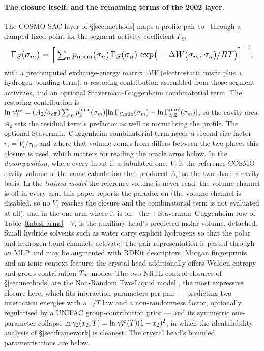 \paragraph{The closure itself, and the remaining terms of the 2002 layer.} The COSMO-SAC layer of
\S\ref{sec:methods} maps a profile pair to \lng\ through a damped fixed point for the segment
activity coefficient $\Gamma_{S}$,
\begin{equation}
  \resizebox{0.98\columnwidth}{!}{$\displaystyle
  \Gamma_{S}(\sigma_m)=\Big[\textstyle\sum_n p_{\mathrm{norm}}(\sigma_n)\,\Gamma_{S}(\sigma_n)\,
  \exp\!\big(-\Delta W(\sigma_m,\sigma_n)/RT\big)\Big]^{-1}$},
  \label{eq:cosmo}
\end{equation}
with a precomputed exchange-energy matrix $\Delta W$ (electrostatic misfit plus a hydrogen-bonding
term), a restoring contribution assembled from those segment activities, and an optional
Staverman--Guggenheim combinatorial term. The restoring
contribution is
$\ln\gamma_2^{\mathrm{res}}=(A_2/a_{\mathrm{eff}})\sum_m p_2^{\mathrm{pure}}(\sigma_m)
[\ln\Gamma_{S,\mathrm{mix}}(\sigma_m)-\ln\Gamma_{S,2}^{\mathrm{pure}}(\sigma_m)]$, so the cavity area
$A_2$ sets the residual term's prefactor as well as normalising the profile. The optional
Staverman--Guggenheim combinatorial term needs a second size factor $r_i=V_i/r_0$, and where that
volume comes from differs between the two places this closure is used, which matters for reading the
oracle arms below. In the \emph{decomposition}, where every input is a
tabulated one, $V_i$ is the reference COSMO cavity volume of the same calculation that produced
$A_i$, so the two share a cavity basis. In the \emph{trained model} the reference volume is never
read: the volume channel is off in every arm this paper reports the paradox on
(the volume channel is disabled, so no $V_i$ reaches the closure and the
combinatorial term is not evaluated at all), and in the one arm where it is on---the
$+$\,Staverman--Guggenheim row of Table~\ref{tab:si-arms}---$V_i$ is the auxiliary head's predicted
molar volume, detached. Small hydride solvents such
as water carry explicit hydrogens so that the polar and hydrogen-bond channels activate. The pair
representation is passed through an MLP and may be augmented with RDKit descriptors, Morgan
fingerprints and an ionic-context feature; the crystal head additionally offers Walden-entropy and
group-contribution $T_m$ modes. The two NRTL control closures of \S\ref{sec:methods} are the
Non-Random Two-Liquid model \cite{renon1968}, the most expressive closure here, which fits
interaction parameters per pair --- predicting two interaction energies with a $1/T$ law and a
non-randomness factor, optionally regularised by a UNIFAC group-contribution prior
\cite{fredenslund1975} --- and its symmetric one-parameter collapse
$\ln\gamma_2(x_2,T)=\ln\gamma_2^\infty(T)(1-x_2)^2$, in which the identifiability analysis of \S\ref{sec:framework} is
cleanest. The crystal head's bounded parametrisations are below.
